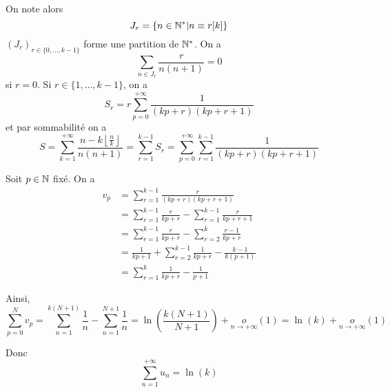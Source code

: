 \begin{solution}
\begin{enumerate}
		On note alors 
		$$J_{r}=\left\{n\in\mathbb{N}^{*}\middle| n\equiv r[k]\right\}$$
		$(J_{r})_{r\in\{0,\dots,k-1\}}$ forme une partition de $\mathbb{N}^{*}$. On a 
		$$\sum_{n\in J_{r}}\frac{r}{n(n+1)}=0$$
		si $r=0$. Si $r\in\{1,\dots,k-1\}$, on a 
		$$S_{r}=r\sum_{p=0}^{+\infty}\frac{1}{(kp+r)(kp+r+1)}$$
		et par sommabilité on a 
		$$S=\sum_{k=1}^{+\infty}\frac{n-k\left\lfloor\frac{n}{k}\right\rfloor}{n(n+1)}=\sum_{r=1}^{k-1}S_{r}=\sum_{p=0}^{+\infty}\sum_{r=1}^{k-1}\frac{1}{(kp+r)(kp+r+1)}$$

		Soit $p\in\mathbb{N}$ fixé. On a 
		\begin{align*}
			v_{p}
			&=\sum_{r=1}^{k-1}\frac{r}{(kp+r)(kp+r+1)}\\
			&=\sum_{r=1}^{k-1}\frac{r}{kp+r}-\sum_{r=1}^{k-1}\frac{r}{kp+r+1}\\
			&=\sum_{r=1}^{k-1}\frac{r}{kp+r}-\sum_{r=2}^{k}\frac{r-1}{kp+r}\\
			&=\frac{1}{kp+1}+\sum_{r=2}^{k-1}\frac{1}{kp+r}-\frac{k-1}{k(p+1)}\\
			&=\sum_{r=1}^{k}\frac{1}{kp+r}-\frac{1}{p+1}
		\end{align*}

		Ainsi, 
		$$\sum_{p=0}^{N}v_{p}=\sum_{n=1}^{k(N+1)}\frac{1}{n}-\sum_{n=1}^{N+1}\frac{1}{n}=\ln\left(\frac{k(N+1)}{N+1}\right)+\underset{n\to+\infty}{o}\left(1\right)=\ln(k)+\underset{n\to+\infty}{o}\left(1\right)$$

		Donc 
		$$\boxed{\sum_{n=1}^{+\infty}u_{n}=\ln(k)}$$
	\end{enumerate}
\end{solution}

